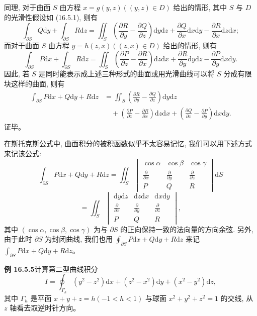 \documentclass[UTF8, 12pt, fontset=fandol, oneside]{ctexart}
\begin{document}
同理, 对于曲面 $S$ 由方程 $x=g(y,z)((y,z)\in D)$ 给出的情形, 其中 $S$ 与 $D$ 的光滑性假设如 (16.5.1), 则有
\[
  \int_{\partial S}Q\mathrm dy+\int_{\partial S}R\mathrm dz
  =\iint_S\left(\frac{\partial R}{\partial y}-\frac{\partial Q}{\partial z}\right)\mathrm dy\mathrm dz
    +\frac{\partial Q}{\partial x}\mathrm dx\mathrm dy-\frac{\partial R}{\partial x}\mathrm dz\mathrm dx;
\]
而对于曲面 $S$ 由方程 $y=h(z,x)((z,x)\in D)$ 给出的情形, 则有
\[
  \int_{\partial S}P\mathrm dx+\int_{\partial S}R\mathrm dz
  =\iint_S\left(\frac{\partial P}{\partial z}-\frac{\partial R}{\partial x}\right)\mathrm dz\mathrm dx
    +\frac{\partial R}{\partial y}\mathrm dy\mathrm dz-\frac{\partial P}{\partial y}\mathrm dx\mathrm dy.
\]
因此, 若 $S$ 是同时能表示成上述三种形式的曲面或用光滑曲线可以将 $S$ 分成有限块这样的曲面, 则有
\[
\begin{aligned}
  \int_{\partial S}P\mathrm dx+Q\mathrm dy+R\mathrm dz
  &=\iint_S\left(\frac{\partial R}{\partial y}-\frac{\partial Q}{\partial z}\right)\mathrm dy\mathrm dz\\
  &\quad+\left(\frac{\partial P}{\partial z}-\frac{\partial R}{\partial x}\right)\mathrm dz\mathrm dx
    +\left(\frac{\partial Q}{\partial x}-\frac{\partial P}{\partial y}\right)\mathrm dx\mathrm dy.
\end{aligned}
\]
证毕。

在斯托克斯公式中, 曲面积分的被积函数似乎不太容易记忆, 我们可以用下述方式来记该公式:
\[
  \int_{\partial S}P\mathrm dx+Q\mathrm dy+R\mathrm dz
  =\iint_S
  \begin{vmatrix}
    \cos\alpha&\cos\beta&\cos\gamma\\
    \frac{\partial}{\partial x}&\frac{\partial}{\partial y}&\frac{\partial}{\partial z}\\
    P&Q&R
  \end{vmatrix}\mathrm dS
\]
\[
  =\iint_S
  \begin{vmatrix}
    \mathrm dy\mathrm dz&\mathrm dz\mathrm dx&\mathrm dx\mathrm dy\\
    \frac{\partial}{\partial x}&\frac{\partial}{\partial y}&\frac{\partial}{\partial z}\\
    P&Q&R
  \end{vmatrix},
\]
其中 $(\cos\alpha,\cos\beta,\cos\gamma)$ 为与 $\partial S$ 的正向保持一致的法向量的方向余弦. 另外, 由于此时 $\partial S$ 为封闭曲线, 我们也用 $\oint_{\partial S}P\mathrm dx+Q\mathrm dy+R\mathrm dz$ 来记 $\int_{\partial S}P\mathrm dx+Q\mathrm dy+R\mathrm dz$。

\noindent\textbf{例 16.5.5}\quad 计算第二型曲线积分
\[
  I=\oint_{\Gamma_h}(y^2-z^2)\mathrm dx+(z^2-x^2)\mathrm dy+(x^2-y^2)\mathrm dz,
\]
其中 $\Gamma_h$ 是平面 $x+y+z=h(-1<h<1)$ 与球面 $x^2+y^2+z^2=1$ 的交线, 从 $z$ 轴看去取逆时针方向。
\end{document}
